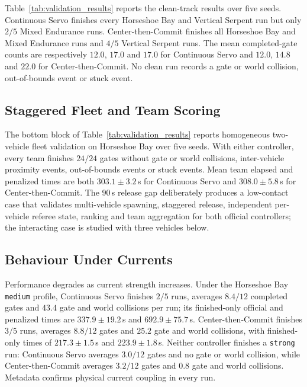

Table~\ref{tab:validation_results} reports the clean-track results over five seeds. Continuous Servo finishes every Horseshoe Bay and Vertical Serpent run but only $2/5$ Mixed Endurance runs. Center-then-Commit finishes all Horseshoe Bay and Mixed Endurance runs and $4/5$ Vertical Serpent runs. The mean completed-gate counts are respectively $12.0$, $17.0$ and $17.0$ for Continuous Servo and $12.0$, $14.8$ and $22.0$ for Center-then-Commit. No clean run records a gate or world collision, out-of-bounds event or stuck event.

\subsection{Staggered Fleet and Team Scoring}

The bottom block of Table~\ref{tab:validation_results} reports homogeneous two-vehicle fleet validation on Horseshoe Bay over five seeds. With either controller, every team finishes $24/24$ gates without gate or world collisions, inter-vehicle proximity events, out-of-bounds events or stuck events. Mean team elapsed and penalized times are both $303.1\pm3.2$\,s for Continuous Servo and $308.0\pm5.8$\,s for Center-then-Commit. The $90$\,s release gap deliberately produces a low-contact case that validates multi-vehicle spawning, staggered release, independent per-vehicle referee state, ranking and team aggregation for both official controllers; the interacting case is studied with three vehicles below.

\subsection{Behaviour Under Currents}
\label{sec:eval_currents}

Performance degrades as current strength increases. Under the Horseshoe Bay \texttt{medium} profile, Continuous Servo finishes $2/5$ runs, averages $8.4/12$ completed gates and $43.4$ gate and world collisions per run; its finished-only official and penalized times are $337.9\pm19.2$\,s and $692.9\pm75.7$\,s. Center-then-Commit finishes $3/5$ runs, averages $8.8/12$ gates and $25.2$ gate and world collisions, with finished-only times of $217.3\pm1.5$\,s and $223.9\pm1.8$\,s. Neither controller finishes a \texttt{strong} run: Continuous Servo averages $3.0/12$ gates and no gate or world collision, while Center-then-Commit averages $3.2/12$ gates and $0.8$ gate and world collisions. Metadata confirms physical current coupling in every run.


